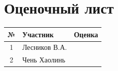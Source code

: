 \section*{Оценочный лист}

\begin{center}

\begin{tabular}{|c|l|p{4cm}|}
\hline
№ & Участник & Оценка \\
\hline
1 & Лесников В.А. & \\[0.5cm]
\hline
2 & Чень Хаолинь & \\[0.5cm]
\hline
\end{tabular}
    
\end{center}